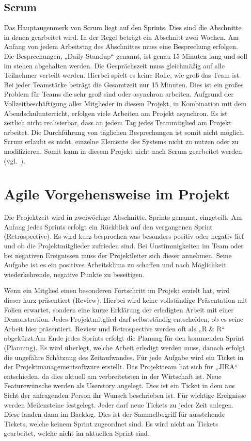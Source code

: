 \subsection{Scrum}
Das Hauptaugenmerk von Scrum liegt auf den Sprints. Dies sind die Abschnitte in
denen gearbeitet wird. In der Regel beträgt ein Abschnitt zwei Wochen. Am
Anfang von jedem Arbeitstag des Abschnittes muss eine Besprechung erfolgen. Die
Besprechungen, „Daily Standup“ genannt, ist genau 15 Minuten lang und soll im
stehen abgehalten werden. Die Gesprächszeit muss gleichmäßig auf alle
Teilnehmer verteilt werden. Hierbei spielt es keine Rolle, wie groß das Team
ist. Bei jeder Teamstärke beträgt die Gesamtzeit nur 15 Minuten. Dies ist ein
großes Problem für Teams die sehr groß sind oder asynchron arbeiten. Aufgrund
der Vollzeitbeschäftigung aller Mitglieder in diesem Projekt, in Kombination
mit dem Abendschulunterricht, erfolgen viele Arbeiten am Projekt asynchron. Es
ist zeitlich nicht realisierbar, dass an jedem Tag jedes Teammitglied am
Projekt arbeitet. Die Durchführung von täglichen Besprechungen ist somit nicht
möglich. Scrum erlaubt es nicht, einzelne Elemente des Systems nicht zu nutzen
oder zu modifizieren. Somit kann in diesem Projekt nicht nach Scrum gearbeitet
werden (vgl.~\cite{scrum_talk}).
\tm%

\section{Agile Vorgehensweise im Projekt}
\label{sec:agile_vorgehensweise}
Die Projektzeit wird in zweiwöchige Abschnitte, Sprints genannt, eingeteilt. Am
Anfang jedes Sprints erfolgt ein Rückblick auf den vergangenen Sprint
(Retrospective). Es wird kurz besprochen was besonders positiv oder negativ
lief und ob die Projektmitglieder zufrieden sind. Bei Unstimmigkeiten im Team
oder bei negativen Ereignissen muss der Projektleiter sich dieser annehmen.
Seine Aufgabe ist es ein positives Arbeitsklima zu schaffen und nach
Möglichkeit wiederkehrende, negative Punkte zu beseitigen.

Wenn ein Mitglied einen besonderen Fortschritt im Projekt erzielt hat, wird
dieser kurz präsentiert (Review). Hierbei wird keine vollständige Präsentation
mit Folien erwartet, sondern eine kurze Erklärung der erledigten Arbeit mit
einer Demonstration. Jedes Projektmitglied darf selbstständig entscheiden, ob
es seine Arbeit hier präsentiert. Review und Retrospective werden oft als „R \&
R“ abgekürzt.Am Ende jedes Sprints erfolgt die Planung für den kommenden Sprint
(Planning). Es wird überlegt, welche Arbeit erledigt werden muss, danach
erfolgt die ungefähre Schätzung des Zeitaufwandes. Für jede Aufgabe wird ein
Ticket in der Projektmanagementsoftware erstellt. Das Projektteam hat sich für
„JIRA“ entschieden, da dies aktuell am verbreitetsten in der Wirtschaft ist.
Neue Featurewünsche werden als Userstory angelegt. Dies ist ein Ticket in dem
aus Sicht der anfragenden Person ihr Wunsch beschrieben ist. Für wichtige
Ereignisse werden Meilensteine festgelegt. Jeder darf neue Tickets zu jeder
Zeit anlegen. Diese landen dann im \gls{Backlog}. Dies ist der Sammelbegriff
für ausstehende Tickets, welche keinem Sprint zugeordnet sind. Es wird nicht an
Tickets gearbeitet, welche nicht im aktuellen Sprint sind.
\tm%

